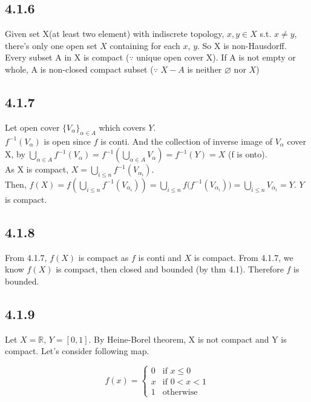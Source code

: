 \documentclass{article}
\let\emptyset\varnothing
\begin{document}
\subsection*{4.1.6}

Given set X(at least two element) with indiscrete topology, $ x, y \in X$ s.t. $x\neq y$, there's only one open set $X$ containing for each $x$, $y$. So X is non-Hausdorff.\\
Every subset A in X is compact ($\because$ unique open cover {X}). If A is not empty or whole, A is non-closed compact subset ($\because$ $X-A$ is neither $\emptyset$ nor $X$)

\subsection*{4.1.7}

Let open cover $\{V_\alpha\}_{\alpha \in A}$ which covers $Y$.\\ $f^{-1}(V_\alpha)$ is open since $f$ is conti. And the collection of inverse image of $V_\alpha$ cover X, by $\bigcup_{\alpha \in A} f^{-1}(V_\alpha)=f^{-1}(\bigcup_{\alpha \in A}V_\alpha)=f^{-1}(Y)=X$ (f is onto).\\
As X is compact, $X=\bigcup_{i \leq n}{f^{-1}(V_{\alpha_i})}$.\\ Then, $f(X)=f(\bigcup_{i \leq n}{f^{-1}(V_{\alpha_i})})=\bigcup_{i \leq n}{f(f^{-1}(V_{\alpha_i})})=\bigcup_{i \leq n} V_{\alpha_i}=Y$.
$Y$ is compact.

\subsection*{4.1.8}

From 4.1.7, $f(X)$ is compact as $f$ is conti and $X$ is compact. From 4.1.7, we know $f(X)$ is compact, then closed and bounded (by thm 4.1). Therefore $f$ is bounded.

\subsection*{4.1.9}

Let $X=\mathbb{R}$, $Y=[0,1]$. By Heine-Borel theorem, X is not compact and Y is compact. Let's consider following map.

\[
f(x) =
\begin{cases}
0 & \text{if } x \leq 0\\
x & \text{if } 0 < x < 1\\
1 & \text{otherwise}
\end{cases}
\]
\end{document}
